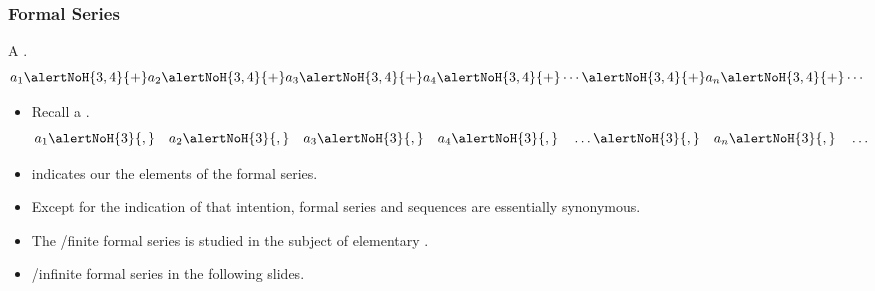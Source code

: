 \begin{frame}
\frametitle{Formal Series}
\begin{definition}
A  .
\vskip -0.1cm
\[
a_1 \alertNoH{3,4}{+} a_2 \alertNoH{3,4}{+} a_3\alertNoH{3,4}{+} a_4\alertNoH{3,4}{+} \cdots \alertNoH{3,4}{+} a_n \alertNoH{3,4}{+} \cdots 
\]
\end{definition}
\begin{itemize}
\item<2-> Recall a . 
\vskip -0.1cm
\[a_1\alertNoH{3}{,}\quad  a_2\alertNoH{3}{,}\quad  a_3\alertNoH{3}{,}\quad  a_4\alertNoH{3}{,} \quad  \dots\alertNoH{3}{,} \quad  a_n\alertNoH{3}{,}\quad \dots\]
\item<4->  indicates our  the elements of the formal series.
\item<5-> Except for the indication of that intention, formal series and sequences are essentially synonymous. 
\item<6-> The /finite formal series is studied in the subject of elementary .
\item<7-> /infinite formal series  in the following slides.
\end{itemize}

\end{frame}
